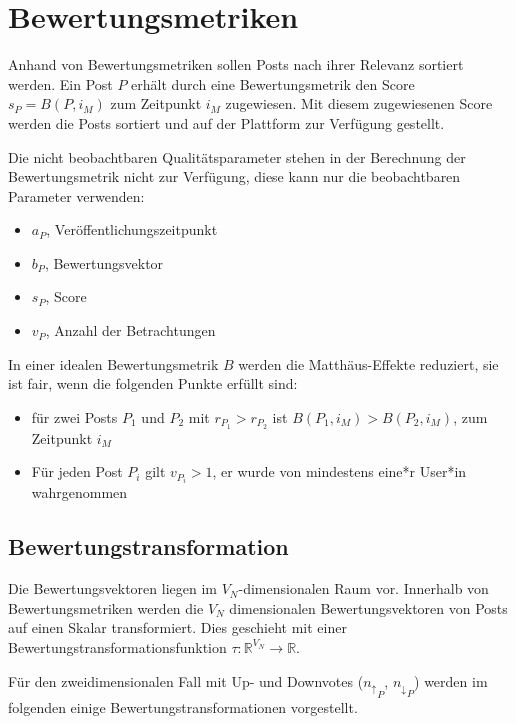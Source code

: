 \chapter{Bewertungsmetriken}
\label{chapter:bewertungsmetriken}

Anhand von Bewertungsmetriken sollen Posts nach ihrer Relevanz sortiert werden. Ein Post $P$ erhält durch eine Bewertungsmetrik den Score $s_P = B(P,i_M)$ zum Zeitpunkt $i_M$ zugewiesen. Mit diesem zugewiesenen Score werden die Posts sortiert und auf der Plattform zur Verfügung gestellt.


Die nicht beobachtbaren Qualitätsparameter stehen in der Berechnung der Bewertungsmetrik nicht zur Verfügung, diese kann nur die beobachtbaren Parameter verwenden:


\begin{itemize}
	\item $a_P$, Veröffentlichungszeitpunkt
	\item $b_P$, Bewertungsvektor
	\item $s_P$, Score
	\item $v_P$, Anzahl der Betrachtungen
\end{itemize}

In einer idealen Bewertungsmetrik $B$ werden die Matthäus-Effekte reduziert, sie ist fair, wenn die folgenden Punkte erfüllt sind:

\begin{itemize}
	\item für zwei Posts $P_1$ und $P_2$ mit $r_{P_1} > r_{P_2}$ ist $B(P_1,i_M) > B(P_2,i_M)$, zum Zeitpunkt $i_M$
	\item Für jeden Post $P_i$ gilt $v_{P_i} > 1$, er wurde von mindestens eine*r User*in wahrgenommen
\end{itemize}

\section{Bewertungstransformation}
\label{voteevaluation}

Die Bewertungsvektoren liegen im $V_N$-dimensionalen Raum vor. Innerhalb von Bewertungsmetriken werden die $V_N$ dimensionalen Bewertungsvektoren von Posts auf einen Skalar transformiert. Dies geschieht mit einer Bewertungstransformationsfunktion $\tau: \mathbb{R}^{V_N} \rightarrow \mathbb{R}$.

Für den zweidimensionalen Fall mit Up- und Downvotes (${n_\uparrow}_P$, ${n_\downarrow}_P$) werden im folgenden einige Bewertungstransformationen vorgestellt.

